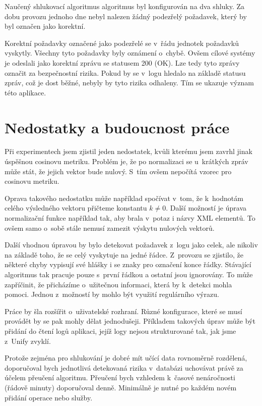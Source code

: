 \documentclass[thesis=M,czech]{FITthesis}[2012/10/20]
\begin{document}
			Naučený shlukovací algoritmus algoritmus byl konfigurován na dva shluky. Za dobu provozu jednoho dne nebyl nalezen žádný podezřelý požadavek, který by byl označen jako korektní.
			
			Korektní požadavky označené jako podezřelé se v~řádu jednotek požadavků vyskytly. Všechny tyto požadavky byly oznámení o~chybě. Ovšem cílové systémy je odeslali jako korektní zprávu se statusem 200 (OK). Lze tedy tyto zprávy označit za bezpečnostní rizika. Pokud by se v~logu hledalo na základě statusu zpráv, což je dost běžné, nebyly by tyto rizika odhaleny. Tím se ukazuje význam této aplikace.
		
		\section{Nedostatky a budoucnost práce}
			Při experimentech jsem zjistil jeden nedostatek, kvůli kterému jsem zavrhl jinak úspěšnou cosinovu metriku. Problém je, že po normalizaci se u~krátkých zpráv může stát, že jejich vektor bude nulový. S~tím ovšem nepočítá vzorec pro cosinovu metriku.
			
			Oprava takového nedostatku může například spočívat v~tom, že k~hodnotám celého výsledného vektoru přičteme konstantu $k \neq 0$. Další možností je úprava normalizační funkce například tak, aby brala v~potaz i názvy XML elementů. To ovšem samo o~sobě stále nemusí zamezit výskytu nulových vektorů.
			
			Další vhodnou úpravou by bylo detekovat požadavek z~logu jako celek, ale nikoliv na základě toho, že se celý vyskytuje na jedné řádce. Z~provozu se zjistilo, že některé chyby vypisují své hlášky i se znaky pro označení konce řádky. Stávající algoritmus tak pracuje pouze s~první řádkou a ostatní jsou ignorovány. To může zapříčinit, že přicházíme o~užitečnou informaci, která by k~detekci mohla pomoci. Jednou z~možností by mohlo být využití regulárního výrazu.
			
			Práce by šla rozšířit o~uživatelské rozhraní. Různé konfigurace, které se musí provádět by se pak mohly dělat jednodušeji. Příkladem takových úprav může být přidání do čtení logů aplikaci, jejíž logy nejsou strukturované tak, jak jsme z~Unify zvyklí. 
			
			Protože zejména pro shlukování je dobré mít učící data rovnoměrně rozdělená, doporučoval bych jednotlivá detekovaná rizika v~databázi uchovávat právě za účelem přeučení algoritmu. Přeučení bych vzhledem k~časové nenáročnosti (řádově minuty) doporučoval denně. Minimálně je nutné po každém novém přidání operace nebo služby.
	
\end{document}
